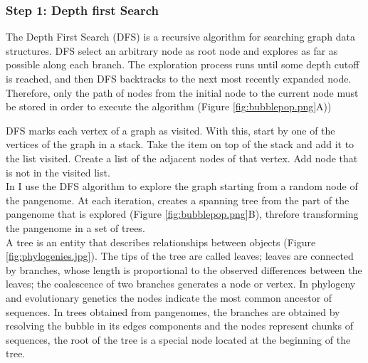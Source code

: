 \setcounter{secnumdepth}{3}
\subsubsection{Step 1: Depth first Search}

The Depth First Search (DFS) \cite{korf1985depth,wiki:DFS} is a recursive algorithm for searching graph data structures. DFS select an arbitrary node as root node and explores as far as possible along each branch. The exploration process runs until some depth cutoff is reached, and then DFS backtracks to the next most recently expanded node. Therefore, only the path of nodes from the initial  node to the current  node  must be stored in order to execute the algorithm (Figure \ref{fig:bubblepop.png}A))

DFS marks each vertex of a graph as visited. With this, start by one of the vertices of the graph in a stack. Take the item on top of the stack and add it to the list visited. Create a list of the adjacent nodes of that vertex. Add node that is not in the visited list.\\

In \bbp I use the DFS algorithm to explore the graph starting from a random node of the pangenome. At each iteration, \bbp creates a spanning tree from the part of the pangenome that is explored (Figure \ref{fig:bubblepop.png}B), threfore transforming the pangenome in a set of trees.\\ %

A tree is an entity that describes relationships between objects (Figure \ref{fig:phylogenies.jpg}). The tips of the tree are called leaves; leaves are connected by branches, whose length is proportional to the observed differences between the leaves; the coalescence of two branches generates a node or vertex. In phylogeny and evolutionary genetics the nodes indicate the most common ancestor of sequences. In trees obtained from pangenomes, the branches are obtained by resolving the bubble in its edges components and the nodes represent chunks of sequences, the root of the tree is a special node located at the beginning of the tree. 

